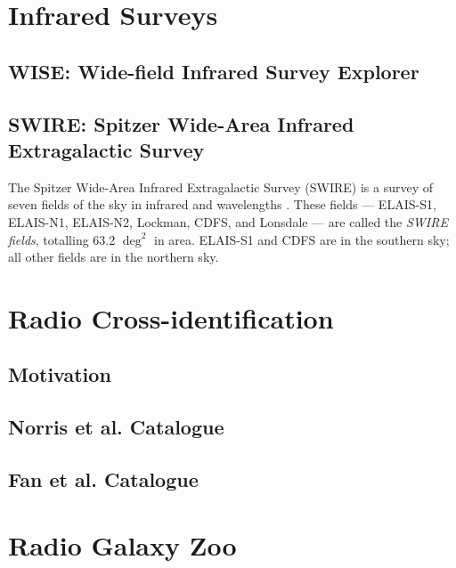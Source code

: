     \section{Infrared Surveys}
    \label{sec:infrared-surveys}

        \subsection{WISE: Wide-field Infrared Survey Explorer}
        \label{sec:wise}

        \subsection{SWIRE: Spitzer Wide-Area Infrared Extragalactic Survey}
        \label{sec:swire}

            The Spitzer Wide-Area Infrared Extragalactic Survey (SWIRE) is a survey of seven fields of the sky in infrared and wavelengths \citep{lonsdale03}. These fields --- ELAIS-S1, ELAIS-N1, ELAIS-N2, Lockman, CDFS, and Lonsdale --- are called the \emph{SWIRE fields}, totalling 63.2 $\deg^2$ in area. ELAIS-S1 and CDFS are in the southern sky; all other fields are in the northern sky.

    \section{Radio Cross-identification}
    \label{sec:radio-cross-identification}

        \subsection{Motivation}
        \label{sec:cross-identification-motivation}

        \subsection{Norris et al. Catalogue}
        \label{sec:norris}

        \subsection{Fan et al. Catalogue}
        \label{sec:fan}

    \section{Radio Galaxy Zoo}
    \label{sec:radio-galaxy-zoo}
